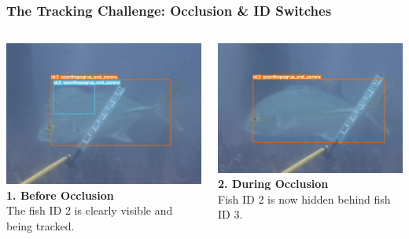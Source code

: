 \documentclass[serif]{beamer}  %
\begin{document}
\begin{frame}
    \frametitle{The Tracking Challenge: Occlusion \& ID Switches}
    
    \begin{columns}[T,totalwidth=\textwidth] 
        \begin{column}{0.32\textwidth}
            \centering
            \includegraphics[width=\linewidth]{images/wrong_occlusion_1.png}
            \vspace{0.5em}
            \tiny
            \textbf{1. Before Occlusion} \\
            The fish ID 2 is clearly visible and being tracked.
        \end{column}
        
        \begin{column}{0.32\textwidth}
            \centering
            \includegraphics[width=\linewidth]{images/wrong_occlusion_2.png}
            \vspace{0.5em}
            \tiny
            \textbf{2. During Occlusion} \\
            Fish ID 2 is now hidden behind fish ID 3.
        \end{column}
        

\end{columns}
\end{frame}
\end{document}
